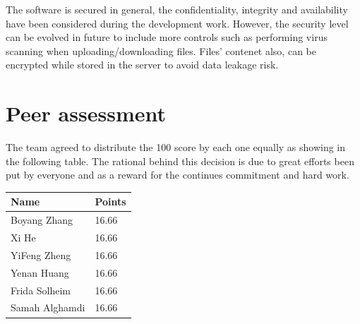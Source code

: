 \documentclass{article}
\begin{document}
The software is secured in general, the confidentiality, integrity and availability have been considered during the development work. However, the security level can be evolved in future to include more controls such as performing virus scanning when uploading/downloading files. Files’ contenet also, can be encrypted while stored in the server to avoid data leakage risk.

\section{Peer assessment}
The team agreed to distribute the 100 score by each one equally as showing in the following table. The rational behind this decision is due to great efforts been put by everyone and as a reward for the continues commitment and hard work.


\begin{center}
\begin{tabular}{ | m{3cm}| m{1.3cm} | }
\hline
\textbf{Name} & \textbf{Points}  \\
\hline
Boyang Zhang & 16.66  \\
\hline
Xi He & 16.66  \\
\hline
YiFeng Zheng & 16.66 \\
\hline
Yenan Huang & 16.66 \\
\hline
Frida Solheim & 16.66 \\
\hline
Samah Alghamdi & 16.66 \\
\hline
\end{tabular}
\end{center}
\end{document}
